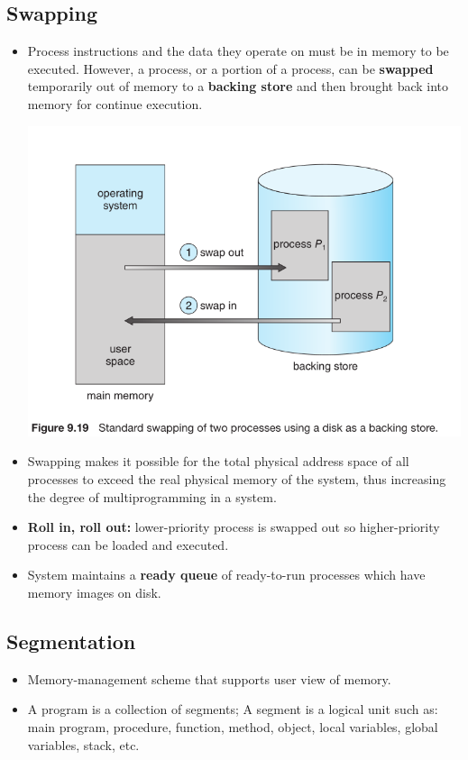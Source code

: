 \documentclass[10pt]{article}
\newcommand{\tf}{\textbf}
\begin{document}
\subsection{Swapping}

\begin{itemize}
	\item Process instructions and the data they operate on must be in memory to be executed. However, a process, or a portion of a process, can be \tf{swapped} temporarily out of memory to a \tf{backing store} and then brought back into memory for continue execution.
	
	\bigbreak
	\includegraphics[scale = 0.7]{Swapping.png}
	\bigbreak

	\item Swapping makes it possible for the total physical address space of all processes to exceed the real physical memory of the system, thus increasing the degree of multiprogramming in a system.
	\item \tf{Roll in, roll out:} lower-priority process is swapped out so higher-priority process can be loaded and executed.
	\item System maintains a \tf{ready queue} of ready-to-run processes which have memory images on disk.
\end{itemize}

\subsection{Segmentation}

\begin{itemize}
	\item Memory-management scheme that supports user view of memory.
	\item A program is a collection of segments; A segment is a logical unit such as: main program, procedure, function, method, object, local variables, global variables, stack, etc.
\end{itemize}
\end{document}
